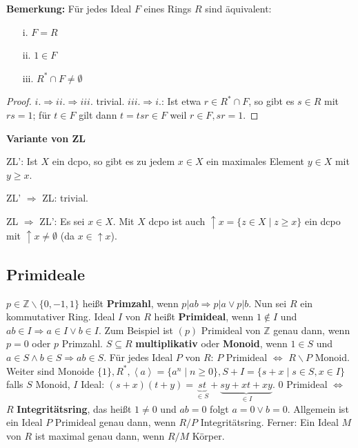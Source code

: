 \documentclass[headsepline=true,DIV=11]{scrartcl}
\theoremstyle{definition}
\newenvironment{gelaber}{}{}
\begin{document}
\begin{gelaber}
  {\bf Bemerkung:} Für jedes Ideal $F$ eines Rings $R$ sind äquivalent:
  \begin{itemize}
    \item[i.] $F=R$
    \item[ii.] $1\in F$
    \item[iii.] $R^*\cap F\neq\emptyset$
  \end{itemize}
  \begin{proof}
    $i.\Rightarrow ii.\Rightarrow iii.$ trivial. $iii.\Rightarrow i.$: Ist etwa $r\in R^*\cap F$, so gibt es $s\in R$ mit $rs=1$; für $t\in F$ gilt
    dann $t=tsr\in F$ weil $r\in F, sr=1$.
  \end{proof}
\end{gelaber}

\begin{gelaber}
  {\bf Variante von ZL}

  ZL': Ist $X$ ein dcpo, so gibt es zu jedem $x\in X$ ein maximales Element $y\in X$ mit $y\ge x$.

  ZL' $\Rightarrow$ ZL: trivial.

  ZL $\Rightarrow$ ZL': Es sei $x\in X$. Mit $X$ dcpo ist auch $\uparrow x = \{z\in X\mid z\ge x\}$ ein dcpo mit $\uparrow x \neq\emptyset$ (da
  $x\in\uparrow x$).
\end{gelaber}


\subsection{Primideale}

$p\in\mathbb{Z}\backslash\{0,-1,1\}$ heißt {\bf Primzahl}, wenn $p|ab\Rightarrow p|a \vee p|b$. Nun sei $R$ ein kommutativer Ring. Ideal $I$ von $R$
heißt {\bf Primideal}, wenn $1\not\in I$ und $ab\in I\Rightarrow a\in I \vee b\in I$. Zum Beispiel ist $(p)$ Primideal von $\mathbb{Z}$ genau dann,
wenn $p=0$ oder $p$ Primzahl. $S\subseteq R$ {\bf multiplikativ} oder {\bf Monoid}, wenn $1\in S$ und $a\in S\wedge b\in S\Rightarrow ab\in S$. Für
jedes Ideal $P$ von $R$: $P$ Primideal $\Leftrightarrow$ $R\backslash P$ Monoid. Weiter sind Monoide $\{1\},R^*,\left<a\right>=\{a^n\mid n\ge 0\},
S+I=\{s+x\mid s\in S,x\in I\}$ falls $S$ Monoid, $I$ Ideal: $(s+x)(t+y) = \underbrace{st}_{\in S}+\underbrace{sy+xt+xy}_{\in I}$. $0$ Primideal
$\Leftrightarrow$ $R$ {\bf Integritätsring}, das heißt $1\neq 0$ und $ab=0$ folgt $a=0\vee b=0$. Allgemein ist ein Ideal $P$ Primideal genau dann,
wenn $R/P$ Integritätsring. Ferner: Ein Ideal $M$ von $R$ ist maximal genau dann, wenn $R/M$ Körper.
\end{document}
